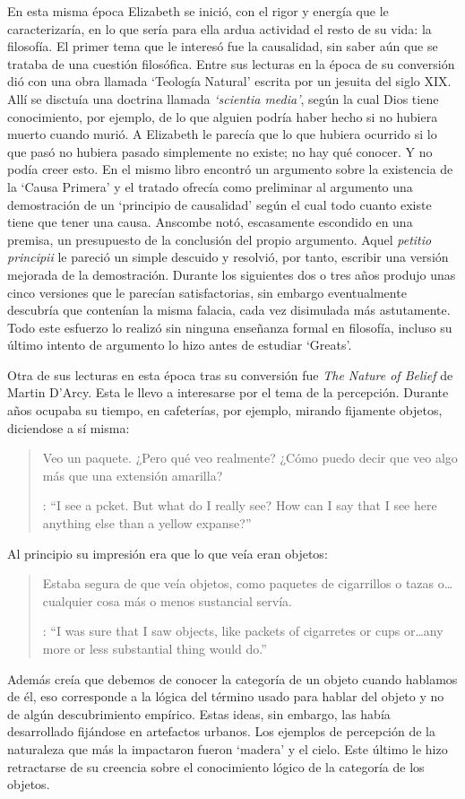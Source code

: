 En esta misma época Elizabeth se inició, con el rigor y energía que le caracterizaría, en lo que sería para ella ardua actividad el resto de su vida: la filosofía. El primer tema que le interesó fue la causalidad, sin saber aún que se trataba de una cuestión filosófica. Entre sus lecturas en la época de su conversión dió con una obra llamada `Teología Natural' escrita por un jesuita del siglo XIX. Allí se disctuía una doctrina llamada \emph{`scientia media'}, según la cual Dios tiene conocimiento, por ejemplo, de lo que alguien podría haber hecho si no hubiera muerto cuando murió. A Elizabeth le parecía que lo que hubiera ocurrido si lo que pasó no hubiera pasado simplemente no existe; no hay qué conocer. Y no podía creer esto. En el mismo libro encontró un argumento sobre la existencia de la `Causa Primera' y el tratado ofrecía como preliminar al argumento una demostración de un `principio de causalidad' según el cual todo cuanto existe tiene que tener una causa. Anscombe notó, escasamente escondido en una premisa, un presupuesto de la conclusión del propio argumento. Aquel \emph{petitio principii} le pareció un simple descuido y resolvió, por tanto, escribir una versión mejorada de la demostración. Durante los siguientes dos o tres años produjo unas cinco versiones que le parecían satisfactorias, sin embargo eventualmente descubría que contenían la misma falacia, cada vez disimulada más astutamente. Todo este esfuerzo lo realizó sin ninguna enseñanza formal en filosofía, incluso su último intento de argumento lo hizo antes de estudiar `Greats'.\autocite[Cf.~][vii]{anscombe1981metaphysics}

Otra de sus lecturas en esta época tras su conversión fue \emph{The Nature of Belief} de Martin D'Arcy. Esta le llevo a interesarse por el tema de la percepción. Durante años ocupaba su tiempo, en cafeterías, por ejemplo, mirando fijamente objetos, diciendose a sí misma: \blockquote[{\cite[viii]{anscombe1981metaphysics}}: \enquote{I see a pcket. But what do I really see? How can I say that I see here anything else than a yellow expanse?}]{Veo un paquete. ¿Pero qué veo realmente? ¿Cómo puedo decir que veo algo más que una extensión amarilla?} Al principio su impresión era que lo que veía eran objetos: \blockquote[{\cite[viii]{anscombe1981metaphysics}}: \enquote{I was sure that I saw objects, like packets of cigarretes or cups or\ldots any more or less substantial thing would do.}]{Estaba segura de que veía objetos, como paquetes de cigarrillos o tazas o\ldots cualquier cosa más o menos sustancial servía.} Además creía que debemos de conocer la categoría de un objeto cuando hablamos de él, eso corresponde a la lógica del término usado para hablar del objeto y no de algún descubrimiento empírico. Estas ideas, sin embargo, las había desarrollado fijándose en artefactos urbanos. Los ejemplos de percepción de la naturaleza que más la impactaron fueron `madera' y el cielo. Este último le hizo retractarse de su creencia sobre el conocimiento lógico de la categoría de los objetos.\autocite[Cf.~][viii]{anscombe1981metaphysics}

